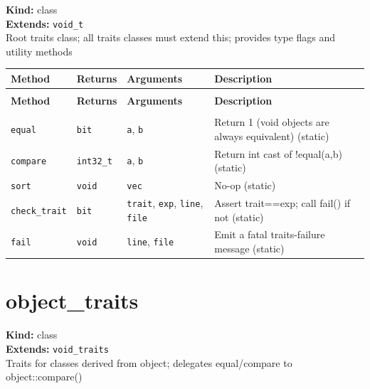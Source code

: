 \documentclass[11pt,letterpaper]{report}
\begin{document}
\noindent\textbf{Kind:} class\\
\noindent\textbf{Extends:} \texttt{void\_t}\\
\noindent Root traits class; all traits classes must extend this; provides type flags and utility methods

\begin{xltabular}{\linewidth}{>{\small}p{1.35in} >{\small}p{1.25in} >{\small}p{0.95in} >{\small}X}
\toprule
\textbf{Method} & \textbf{Returns} & \textbf{Arguments} & \textbf{Description} \\
\midrule
\endfirsthead
{} \\
\midrule
\textbf{Method} & \textbf{Returns} & \textbf{Arguments} & \textbf{Description} \\
\midrule
\endhead
\midrule
{} \\
\endfoot
\bottomrule
\endlastfoot
\texttt{equal} & \texttt{bit} & \texttt{a}, \texttt{b} & Return 1 (void objects are always equivalent) (static) \\
\texttt{compare} & \texttt{int32\_t} & \texttt{a}, \texttt{b} & Return int cast of !equal(a,b) (static) \\
\texttt{sort} & \texttt{void} & \texttt{vec} & No-op (static) \\
\texttt{check\_trait} & \texttt{bit} & \texttt{trait}, \texttt{exp}, \texttt{line}, \texttt{file} & Assert trait==exp; call fail() if not (static) \\
\texttt{fail} & \texttt{void} & \texttt{line}, \texttt{file} & Emit a fatal traits-failure message (static) \\
\end{xltabular}

\section{object\_traits}
\label{cls:objecttraits}

\noindent\textbf{Kind:} class\\
\noindent\textbf{Extends:} \texttt{void\_traits}\\
\noindent Traits for classes derived from object; delegates equal/compare to object::compare()
\end{document}
